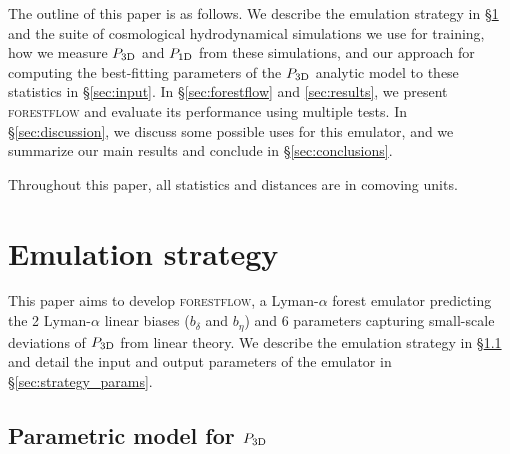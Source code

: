 \documentclass[longauth]{aa}
\newcommand{\lya}{Lyman-$\alpha$\xspace}
\newcommand{\lyaf}{Lyman-$\alpha$ forest\xspace}
\newcommand{\poned}{\ensuremath{P_{\rm 1D}}\xspace}
\newcommand{\pthreed}{\ensuremath{P_{\rm 3D}}\xspace}
\newcommand{\forestflow}{\textsc{forestflow}\xspace}
\begin{document}
The outline of this paper is as follows. We describe the emulation strategy in \S\ref{sec:strategy} and the suite of cosmological hydrodynamical simulations we use for training, how we measure \pthreed and \poned from these simulations, and our approach for computing the best-fitting parameters of the \pthreed analytic model to these statistics in \S\ref{sec:input}. In \S\ref{sec:forestflow} and \ref{sec:results}, we present \forestflow and evaluate its performance using multiple tests. In \S\ref{sec:discussion}, we discuss some possible uses for this emulator, and we summarize our main results and conclude in \S\ref{sec:conclusions}.

Throughout this paper, all statistics and distances are in comoving units.


\section{Emulation strategy}
\label{sec:strategy}

This paper aims to develop \forestflow, a \lyaf emulator predicting the 2 \lya linear biases ($b_\delta$ and $b_\eta$) and 6 parameters capturing small-scale deviations of \pthreed from linear theory. We describe the emulation strategy in \S\ref{sec:strategy_model} and detail the input and output parameters of the emulator in \S\ref{sec:strategy_params}.


\subsection{Parametric model for \pthreed}
\label{sec:strategy_model}
\end{document}
